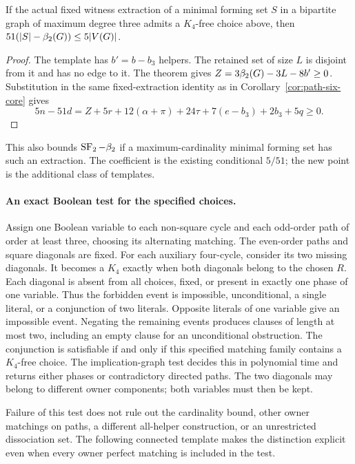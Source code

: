 \begin{corollary}\label{cor:owner-matching-gap}
If the actual fixed witness extraction of a minimal forming set $S$ in a
bipartite graph of maximum degree three admits a $K_4$-free choice above, then
$51(|S|-\beta_2(G))\le5|V(G)|$.
\end{corollary}
\begin{proof}
The template has $b'=b-b_3$ helpers. The retained set of size $L$ is disjoint
from it and has no edge to it. The theorem gives
$Z=3\beta_2(G)-3L-8b'\ge0$. Substitution in the same fixed-extraction identity
as in Corollary~\ref{cor:path-six-core} gives
\[
 5n-51d=Z+5r+12(\alpha+\pi)+24\tau+7(e-b_3)+2b_3+5q\ge0.
\]
\end{proof}
This also bounds $\operatorname{SF}_2-\beta_2$ if a maximum-cardinality minimal forming set
has such an extraction. The coefficient is the existing conditional $5/51$;
the new point is the additional class of templates.

\paragraph{An exact Boolean test for the specified choices.}
Assign one Boolean variable to each non-square cycle and each odd-order path
of order at least three, choosing its alternating matching. The even-order
paths and square diagonals are fixed. For each auxiliary four-cycle, consider
its two missing diagonals. It becomes a $K_4$ exactly when both diagonals
belong to the chosen $R$. Each diagonal is absent from all choices, fixed,
or present in exactly one phase of one variable. Thus the forbidden event
is impossible, unconditional, a single literal, or a conjunction of two
literals. Opposite literals of one variable give an impossible event.
Negating the remaining events produces clauses of length at most two,
including an empty clause for an unconditional obstruction. The conjunction
is satisfiable if and only if this specified matching family contains a
$K_4$-free choice. The implication-graph test decides this in polynomial time
and returns either phases or contradictory directed paths. The two diagonals
may belong to different owner components; both variables must then be kept.

Failure of this test does not rule out the cardinality bound, other owner
matchings on paths, a different all-helper construction, or an unrestricted
dissociation set. The following connected template makes the distinction
explicit even when every owner perfect matching is included in the test.

